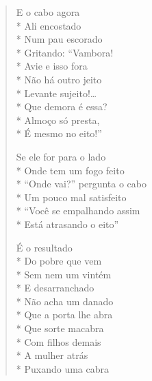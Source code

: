 \begin{verse}
E o cabo agora\\*
Ali encostado\\*
Num pau escorado\\*
Gritando: ``Vambora!\\*
Avie e isso fora\\*
Não há outro jeito\\*
Levante sujeito!\ldots{}\\*
Que demora é essa?\\*
Almoço só presta,\\*
É mesmo no eito!''

Se ele for para o lado\\*
Onde tem um fogo feito\\*
``Onde vai?'' pergunta o cabo\\*
Um pouco mal satisfeito\\*
``Você se empalhando assim\\*
Está atrasando o eito''

É o resultado\\*
Do pobre que vem\\*
Sem nem um vintém\\*
E desarranchado\\*
Não acha um danado\\*
Que a porta lhe abra\\*
Que sorte macabra\\*
Com filhos demais\\*
A mulher atrás\\*
Puxando uma cabra

\end{verse}
